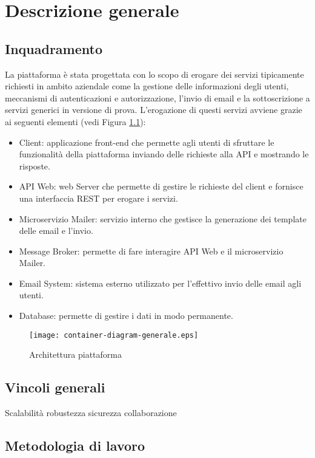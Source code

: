\chapter{Descrizione generale}

\section{Inquadramento}
La piattaforma è stata progettata con lo scopo di erogare dei servizi tipicamente richiesti in ambito aziendale come la gestione delle
informazioni degli utenti, meccanismi di autenticazioni e autorizzazione, l'invio di
email e la sottoscrizione a servizi generici in versione di prova.
L'erogazione di questi servizi avviene grazie ai seguenti elementi (vedi Figura \ref{fig:Piattaforma}):
\begin{itemize}
    \itemsep0em
    \item Client: applicazione front-end che permette agli utenti di sfruttare le funzionalità della piattaforma inviando delle richieste alla API e mostrando le risposte.
    \item API Web: web Server che permette di gestire le richieste del client e fornisce una interfaccia REST per erogare i servizi.
    \item Microservizio Mailer: servizio interno che gestisce la generazione dei template delle email e l'invio.
    \item Message Broker: permette di fare interagire API Web e il microservizio Mailer.
    \item Email System: sistema esterno utilizzato per l'effettivo invio delle email agli utenti.
    \item Database: permette di gestire i dati in modo permanente.
\end{itemize}

\begin{figure}[H]
    \centering
    \texttt{[image: container-diagram-generale.eps]}
    \caption{Architettura piattaforma}
    \label{fig:Piattaforma}
\end{figure}
\newpage

\section{Vincoli generali}
Scalabilità
robustezza
sicurezza
collaborazione


\section{Metodologia di lavoro}


